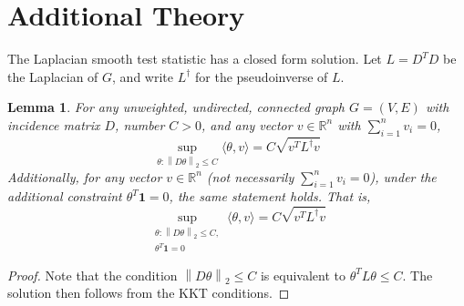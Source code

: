 \documentclass{article}
\newcommand{\Reals}{\mathbb{R}}
\newcommand{\norm}[1]{\left\lVert#1\right\rVert}
\newcommand{\dotp}[2]{\langle #1, #2 \rangle}
\newcommand{\1}{\mathbb{I}}
\newcommand{\Linv}{L^{\dagger}}
\theoremstyle{alden}
\theoremstyle{aldenthm}
\newtheorem{lemma}{Lemma}
\theoremstyle{definition}
\theoremstyle{remark}
\begin{document}
\section{Additional Theory}

The Laplacian smooth test statistic has a closed form solution. Let $L = D^T D$ be the Laplacian of $G$, and write $\Linv$ for the pseudoinverse of $L$. 

\begin{lemma}
	\label{lem: closed_form_ls_statistic}
	For any unweighted, undirected, connected graph $G = (V,E)$ with incidence matrix $D$, number $C > 0$, and any vector $v \in \Reals^n$ with $\sum_{i = 1}^{n} v_i = 0$,
	\begin{equation*}
	\sup_{\theta: \norm{D\theta}_2 \leq C} \dotp{\theta}{v} = C \sqrt{v^T \Linv v}
	\end{equation*}
	Additionally, for any vector $v \in \Reals^n$ (not necessarily $\sum_{i = 1}^{n} v_i = 0$), under the additional constraint $\theta^T \mathbf{1} = 0$, the same statement holds. That is,
	\begin{equation*}
	\sup_{ \substack{\theta: \norm{D\theta}_2 \leq C, \\ \theta^T \mathbf{1} = 0} } \dotp{\theta}{v} = C \sqrt{v^T \Linv v}
	\end{equation*}
\end{lemma}
\begin{proof}
	Note that the condition $\norm{D \theta}_2 \leq C$ is equivalent to $\theta^T L \theta \leq C$. The solution then follows from the KKT conditions.
\end{proof}
\end{document}
